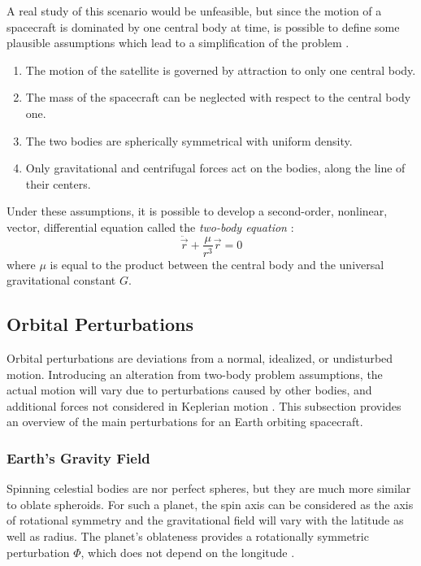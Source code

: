 A real study of this scenario would be unfeasible, but since the motion of a spacecraft is dominated by one central body at time, is possible to define some plausible assumptions which lead to a simplification of the problem \cite{brown1998spacecraft}.
\begin{enumerate}
    \item The motion of the satellite is governed by attraction to only one central body.
    \item The mass of the spacecraft can be neglected with respect to the central body one.
    \item The two bodies are spherically symmetrical with uniform density.
    \item Only gravitational and centrifugal forces act on the bodies, along the line of their centers. 
\end{enumerate}
Under these assumptions, it is possible to develop a second-order, nonlinear, vector, differential equation called the \textit{two-body equation} \cite{vallado2013fundamentals}:
\begin{equation} \label{kepler_eq}
    \ddot{\vec{r}} + \frac{\mu}{r^3}\vec{r} = 0
\end{equation}
where $\mu$ is equal to the product between the central body and the universal gravitational constant $G$.


\subsection{Orbital Perturbations} \label{perturbations}
Orbital perturbations are deviations from a normal, idealized, or undisturbed motion.
Introducing an alteration from two-body problem assumptions, the actual motion will vary due to perturbations caused by other bodies, and additional forces not considered in Keplerian motion \cite{vallado2013fundamentals}.
This subsection provides an overview of the main perturbations for an Earth orbiting spacecraft.


\subsubsection{Earth's Gravity Field}
Spinning celestial bodies are nor perfect spheres, but they are much more similar to oblate spheroids.
For such a planet, the spin axis can be considered as the axis of rotational symmetry and the gravitational field will vary with the latitude as well as radius.
The planet's oblateness provides a rotationally symmetric perturbation $\Phi$, which does not depend on the longitude \cite{curtis2020orbital}.

